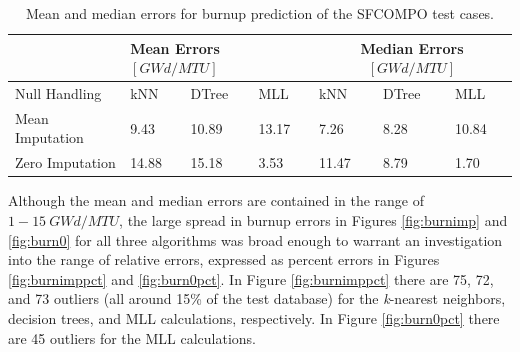 \begin{table}[!htb]
  \centering
  \begin{tabular}{@{}m{1.5in}llllll@{}}
    \toprule
                     & \multicolumn{3}{m{2in}}{Mean Errors $[GWd/MTU]$} 
                     & \multicolumn{3}{c}{Median Errors $[GWd/MTU]$} 
                     \\ \toprule
    Null Handling    & kNN   & DTree & MLL   & kNN   & DTree & MLL    \\ \midrule
    Mean Imputation  & 9.43  & 10.89 & 13.17 & 7.26  & 8.28  & 10.84  \\
    Zero Imputation  & 14.88 & 15.18 & 3.53  & 11.47 & 8.79  & 1.70   \\ \bottomrule
  \end{tabular}
  \caption[Performance of burnup regression of \acrshort{SFCOMPO} entries]
          {Mean and median errors for burnup prediction of the 
          \acrshort{SFCOMPO} test cases.}
  \label{tbl:sfcoburn}
\end{table}

Although the mean and median errors are contained in the range of $1-15\:
GWd/MTU$, the large spread in burnup errors in Figures \ref{fig:burnimp} and
\ref{fig:burn0} for all three algorithms was broad enough to warrant an
investigation into the range of relative errors, expressed as percent errors in
Figures \ref{fig:burnimppct} and \ref{fig:burn0pct}.  In Figure
\ref{fig:burnimppct} there are 75, 72, and 73 outliers (all around 15\% of the
test database) for the \textit{k}-nearest neighbors, decision trees, and
\gls{MLL} calculations, respectively.  In Figure \ref{fig:burn0pct} there are
45 outliers for the \gls{MLL} calculations.

